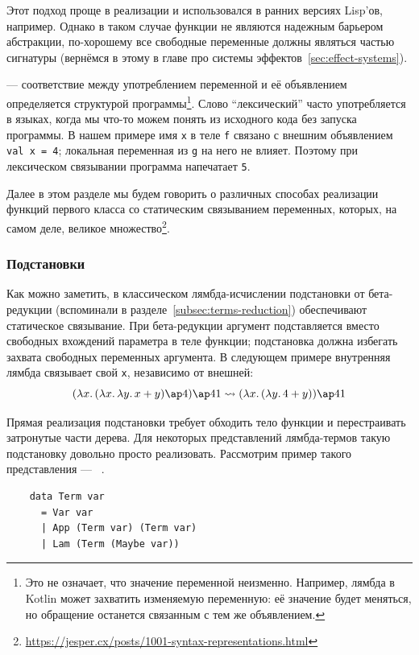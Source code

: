 Этот подход проще в реализации и использовался в ранних версиях Lisp'ов, например.
Однако в таком случае функции не являются надежным барьером абстракции, по-хорошему все свободные переменные должны являться частью сигнатуры (вернёмся в этому в главе про системы эффектов~\ref{sec:effect-systems}).

 --- соответствие между употреблением переменной и её объявлением определяется структурой программы\footnote{Это не означает, что значение переменной неизменно. Например, лямбда в Kotlin может захватить изменяемую переменную: её значение будет меняться, но обращение останется связанным с тем же объявлением.}.
Слово ``лексический'' часто употребляется в языках, когда мы что-то можем понять из исходного кода без запуска программы.
В нашем примере имя \texttt{x} в теле \texttt{f} связано с внешним объявлением \texttt{val x = 4}; локальная переменная из \texttt{g} на него не влияет.
Поэтому при лексическом связывании программа напечатает \texttt{5}.

Далее в этом разделе мы будем говорить о различных способах реализации функций первого класса со статическим связыванием переменных, которых, на самом деле, великое множество\footnote{\url{https://jesper.cx/posts/1001-syntax-representations.html}}.

\subsubsection{Подстановки} \label{subsubsec:substitutions}

Как можно заметить, в классическом лямбда-исчислении подстановки от бета-редукции (вспоминали в разделе~\ref{subsec:terms-reduction}) обеспечивают статическое связывание.
При бета-редукции аргумент подставляется вместо свободных вхождений параметра в теле функции; подстановка должна избегать захвата свободных переменных аргумента.
В следующем примере внутренняя лямбда связывает свой \texttt{x}, независимо от внешней:
\[
    (\lambda x\ldotp (\lambda x\ldotp \lambda y\ldotp x + y) \ap 4) \ap 41 \rightsquigarrow (\lambda x\ldotp (\lambda y\ldotp 4 + y)) \ap 41
\]

Прямая реализация подстановки требует обходить тело функции и перестраивать затронутые части дерева.
Для некоторых представлений лямбда-термов такую подстановку довольно просто реализовать.
Рассмотрим пример такого представления --- ~\cite{chargueraud2012locally}.

\begin{verbatim}
    data Term var
      = Var var
      | App (Term var) (Term var)
      | Lam (Term (Maybe var))
\end{verbatim}

